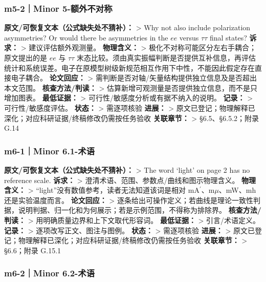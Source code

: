 \documentclass[
  chinese,
  UTF8]{ctexart}
\begin{document}
\subsubsection{m5-2｜Minor
5-额外不对称}\label{m5-2minor-5-ux989dux5916ux4e0dux5bf9ux79f0}

\textbf{原文/可恢复文本（公式缺失处不猜补）：} \textgreater{} Why not
also include polarization asymmetries? Or would there be asymmetries in
the \(ee\) versus \(\tau\tau\) final states? \textbf{诉求：}
\textgreater{} 建议评估额外观测量。 \textbf{物理含义：} \textgreater{}
极化不对称可能区分左右手耦合；原文提出的是 \(ee\) 与 \(\tau\tau\)
末态比较。须由真实振幅判断是否提供互补信息，再评估统计和系统误差。电子在原模型树级新规范相互作用下中性，不能因此假定存在直接电子耦合。
\textbf{论文回应：} \textgreater{}
需判断是否对轴/矢量结构提供独立信息及是否超出本文范围。
\textbf{核查方法/判读：} \textgreater{}
估算新增可观测量是否提供独立信息，而不是只增加图表。 \textbf{最低证据：}
\textgreater{} 可行性/敏感度分析或有据不纳入的说明。 \textbf{记录：}
\textgreater{} 可行性/敏感度评估。 \textbf{状态：} \textgreater{}
需逐项核验 \textbf{进展：} \textgreater{}
原文已登记；物理解释已深化；对应科研证据/终稿修改仍需按任务验收
\textbf{关联章节：} \textgreater{} §6.5、§6.5.2；附录 G.14

\subsubsection{m6-1｜Minor 6.1-术语}\label{m6-1minor-6.1-ux672fux8bed}

\textbf{原文/可恢复文本（公式缺失处不猜补）：} \textgreater{} The word
`light' on page 2 has no reference scale. \textbf{诉求：} \textgreater{}
澄清术语、范围、参数点/曲线和图示物理含义。 \textbf{物理含义：}
\textgreater{} ``light''没有数值参考，读者无法知道该词是相对
mA\ensuremath{^\prime}、m\ensuremath{\mu}、mW、mh 还是实验温度而言。
\textbf{论文回应：} \textgreater{}
逐条给出可操作定义；若曲线是理论一致性判据，说明判据、归一化和为何展示；若是示例范围，不得称为排除界。
\textbf{核查方法/判读：} \textgreater{}
用明确质量边界和上下文取代形容词。 \textbf{最低证据：} \textgreater{}
引言/术语定义。 \textbf{记录：} \textgreater{}
逐项改写正文、图注与图例。 \textbf{状态：} \textgreater{} 需逐项核验
\textbf{进展：} \textgreater{}
原文已登记；物理解释已深化；对应科研证据/终稿修改仍需按任务验收
\textbf{关联章节：} \textgreater{} §6.6；附录 G.15.1

\subsubsection{m6-2｜Minor 6.2-术语}\label{m6-2minor-6.2-ux672fux8bed}
\end{document}
